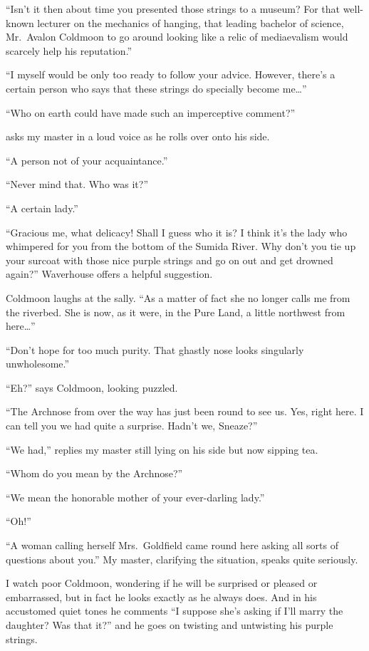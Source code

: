 \documentclass{book}
\begin{document}
``Isn't it then about time you presented those strings to a museum? For
that well-known lecturer on the mechanics of hanging, that leading
bachelor of science, Mr.~Avalon Coldmoon to go around looking like a
relic of mediaevalism would scarcely help his reputation.''

``I myself would be only too ready to follow your advice. However,
there's a certain person who says that these strings do specially become
me\ldots{}''

``Who on earth could have made such an imperceptive comment?''

asks my master in a loud voice as he rolls over onto his side.

``A person not of your acquaintance.''

``Never mind that. Who was it?''

``A certain lady.''

``Gracious me, what delicacy! Shall I guess who it is? I think it's the
lady who whimpered for you from the bottom of the Sumida River. Why
don't you tie up your surcoat with those nice purple strings and go on
out and get drowned again?'' Waverhouse offers a helpful suggestion.

Coldmoon laughs at the sally. ``As a matter of fact she no longer calls
me from the riverbed. She is now, as it were, in the Pure Land, a little
northwest from here\ldots{}''

``Don't hope for too much purity. That ghastly nose looks singularly
unwholesome.''

``Eh?'' says Coldmoon, looking puzzled.

``The Archnose from over the way has just been round to see us. Yes,
right here. I can tell you we had quite a surprise. Hadn't we, Sneaze?''

``We had,'' replies my master still lying on his side but now sipping
tea.

``Whom do you mean by the Archnose?''

``We mean the honorable mother of your ever-darling lady.''

``Oh!''

``A woman calling herself Mrs.~Goldfield came round here asking all
sorts of questions about you.'' My master, clarifying the situation,
speaks quite seriously.

I watch poor Coldmoon, wondering if he will be surprised or pleased or
embarrassed, but in fact he looks exactly as he always does. And in his
accustomed quiet tones he comments ``I suppose she's asking if I'll
marry the daughter? Was that it?'' and he goes on twisting and
untwisting his purple strings.
\end{document}
